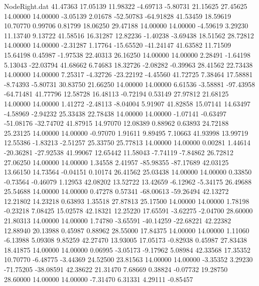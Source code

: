 \begin{filecontents}{NodeRight.dat}
  41.47363   17.05139   11.98322    -4.69713   -5.80731   21.15625   27.45625   14.00000   14.00000   -3.05139    2.01678  -52.50783  -64.91828
  41.53459   18.59619   10.70770     0.99706    0.81799   18.06250   29.47188   14.00000   14.00000   -4.59619    3.29230   11.13740    9.13722
  41.58516   16.31287   12.82236    -1.40238   -3.69438   18.51562   28.72812   14.00000   14.00000   -2.31287    1.17764  -15.65520  -41.24147
  41.63582   11.71509   15.64198     0.45987   -1.97538   22.40313   26.16250   14.00000   14.00000    2.28491   -1.64198    5.13043  -22.03794
  41.68662    6.74683   18.32726    -2.08282   -0.39963   28.41562   22.73438   14.00000   14.00000    7.25317   -4.32726  -23.22192   -4.45560
  41.72725    7.38464   17.58881    -8.74393   -5.80731   30.83750   21.66250   14.00000   14.00000    6.61536   -3.58881  -97.43958  -64.71481
  41.77796   12.58728   16.48113    -0.72194    0.53149   27.97812   21.68125   14.00000   14.00000    1.41272   -2.48113   -8.04004    5.91907
  41.82858   15.07141   14.63497    -4.58969   -2.94232   25.33438   22.78438   14.00000   14.00000   -1.07141   -0.63497  -51.08176  -32.74702
  41.87915   14.97070   12.08389     0.88962    0.63893   24.72188   25.23125   14.00000   14.00000   -0.97070    1.91611    9.89495    7.10663
  41.93998   13.99719   12.55386    -1.83213   -2.51257   25.33750   25.77813   14.00000   14.00000    0.00281    1.44614  -20.36281  -27.92538
  41.99067   12.65442   11.58043    -7.74119   -7.84862   26.72812   27.06250   14.00000   14.00000    1.34558    2.41957  -85.98355  -87.17689
  42.03125   13.66150   14.73564    -0.04151    0.10174   26.41562   25.03438   14.00000   14.00000    0.33850   -0.73564   -0.46079    1.12953
  42.08202   13.52722   13.42659    -6.12962   -5.34175   26.49688   25.54688   14.00000   14.00000    0.47278    0.57341  -68.00613  -59.26494
  42.13272   12.21802   14.23218     0.63893    1.35518   27.87813   25.17500   14.00000   14.00000    1.78198   -0.23218    7.08425   15.02578
  42.18321   12.25220   17.65591    -3.62275   -2.04700   28.60000   21.80313   14.00000   14.00000    1.74780   -3.65591  -40.14259  -22.68221
  42.22382   12.88940   20.13988     0.45987    0.88962   28.55000   17.84375   14.00000   14.00000    1.11060   -6.13988    5.09308    9.85259
  42.27470   13.93005   17.05173    -0.82938    0.45987   27.83438   18.41875   14.00000   14.00000    0.06995   -3.05173   -9.17962    5.08984
  42.33568   17.35352   10.70770    -6.48775   -3.44369   24.52500   23.81563   14.00000   14.00000   -3.35352    3.29230  -71.75205  -38.08591
  42.38622   21.31470    7.68669     0.38824   -0.07732   19.28750   28.60000   14.00000   14.00000   -7.31470    6.31331    4.29111   -0.85457

\end{filecontents}
